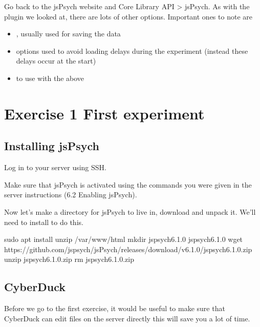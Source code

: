 \documentclass[letterpaper,10pt,english]{sphinxmanual}
\begin{document}
Go back to the jsPsych website and Core Library API \textgreater{} jsPsych. As with the
plugin we looked at, there are lots of other options. Important ones to note
are
\begin{itemize}
\item {} 
, usually used for saving the data

\item {} 
 options used to avoid loading delays during the experiment
(instead these delays occur at the start)

\item {} 
 to use with the above

\end{itemize}


\section{Exercise 1 \textendash{} First experiment}
\label{\detokenize{jspsych_au:exercise-1-first-experiment}}

\subsection{Installing jsPsych}
\label{\detokenize{jspsych_au:installing-jspsych}}
Log in to your server using SSH.

Make sure that jsPsych is activated using the commands you were given in the
server instructions (6.2 Enabling jsPsych).

Now let’s make a directory for jsPsych to live in, download and unpack it.
We’ll need to install  to do this.

\begin{sphinxVerbatim}[commandchars=\\\{\}]
sudo apt install unzip
 /var/www/html
mkdir jspsych\PYGZhy{}6.1.0
 jspsych\PYGZhy{}6.1.0
wget https://github.com/jspsych/jsPsych/releases/download/v6.1.0/jspsych\PYGZhy{}6.1.0.zip
unzip jspsych\PYGZhy{}6.1.0.zip
rm jspsych\PYGZhy{}6.1.0.zip
\end{sphinxVerbatim}


\subsection{CyberDuck}
\label{\detokenize{jspsych_au:cyberduck}}
Before we go to the first exercise, it would be useful to make sure that
CyberDuck can edit files on the server
directly \textendash{} this will save you a lot of time.
\end{document}
